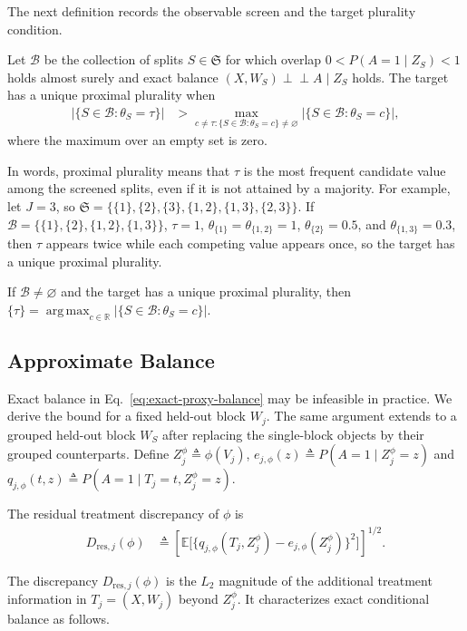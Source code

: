 The next definition records the observable screen and the target plurality condition.
\begin{definition}
\label{def:population-plurality}
Let $\mathcal B$ be the collection of splits $S\in\mathfrak S$ for which overlap $0<P(A=1\mid Z_S)<1$ holds almost surely and exact balance $(X,W_S)\perp\!\!\!\perp A\mid Z_S$ holds. The target has a unique proximal plurality when
\begin{align}
|\{S\in\mathcal B:\theta_S=\tau\}| &>\max_{c\ne\tau:\{S\in\mathcal B:\theta_S=c\}\ne\varnothing}|\{S\in\mathcal B:\theta_S=c\}|,
\label{eq:unique-target-plurality}
\end{align}
where the maximum over an empty set is zero.
\end{definition}
In words, proximal plurality means that $\tau$ is the most frequent candidate value among the screened splits, even if it is not attained by a majority. For example, let $J=3$, so $\mathfrak S=\{\{1\},\{2\},\{3\},\{1,2\},\{1,3\},\{2,3\}\}$. If $\mathcal B=\{\{1\},\{2\},\{1,2\},\{1,3\}\}$, $\tau=1$, $\theta_{\{1\}}=\theta_{\{1,2\}}=1$, $\theta_{\{2\}}=0.5$, and $\theta_{\{1,3\}}=0.3$, then $\tau$ appears twice while each competing value appears once, so the target has a unique proximal plurality.

\begin{theorem}
\label{thm:unknown-valid-block-identification}
If $\mathcal B\ne\varnothing$ and the target has a unique proximal plurality, then $\{\tau\}=\operatorname*{arg\,max}_{c\in\mathbb R}|\{S\in\mathcal B:\theta_S=c\}|$.
\end{theorem}

\subsection{Approximate Balance}
\label{sec:imperfect-balance}

Exact balance in Eq.~\eqref{eq:exact-proxy-balance} may be infeasible in practice. We derive the bound for a fixed held-out block $W_j$. The same argument extends to a grouped held-out block $W_S$ after replacing the single-block objects by their grouped counterparts. Define $Z_j^\phi \triangleq \phi(V_j)$, $e_{j,\phi}(z) \triangleq P(A=1\mid Z_j^\phi=z)$ and $q_{j,\phi}(t,z) \triangleq P(A=1\mid T_j=t,Z_j^\phi=z)$.

\begin{definition}
\label{def:held-out-proxy-discrepancy}
The residual treatment discrepancy of $\phi$ is
\begin{align}\label{eq:residual-treatment-discrepancy}
	D_{\mathrm{res},j}(\phi) &\triangleq\left[\mathbb E\bigl[\{q_{j,\phi}(T_j,Z_j^\phi)-e_{j,\phi}(Z_j^\phi)\}^2\bigr]\right]^{1/2}.
\end{align}
\end{definition}
The discrepancy $D_{\mathrm{res},j}(\phi)$ is the $L_2$ magnitude of the additional treatment information in $T_j=(X,W_j)$ beyond $Z_j^\phi$. It characterizes exact conditional balance as follows.

